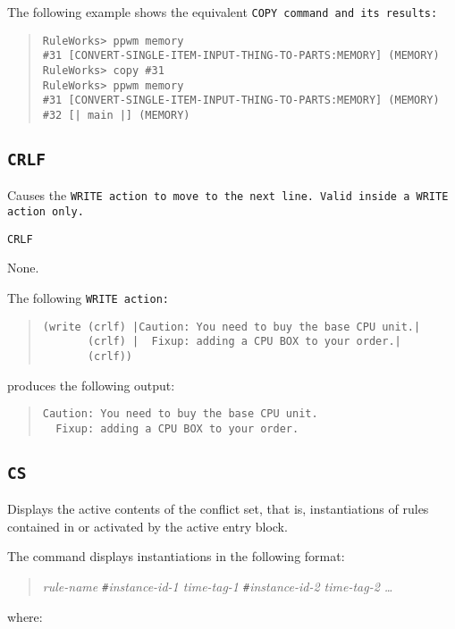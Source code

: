 The following example shows the equivalent \tt{COPY} command and its
results:

\begin{quote}
\begin{verbatim}
RuleWorks> ppwm memory
#31 [CONVERT-SINGLE-ITEM-INPUT-THING-TO-PARTS:MEMORY] (MEMORY)
RuleWorks> copy #31
RuleWorks> ppwm memory
#31 [CONVERT-SINGLE-ITEM-INPUT-THING-TO-PARTS:MEMORY] (MEMORY)
#32 [| main |] (MEMORY)
\end{verbatim}
\end{quote}

\subsection{\tt{CRLF}}

Causes the \tt{WRITE} action to move to the next line. Valid inside a
\tt{WRITE} action only.

\Format

\tt{CRLF}

\Arguments

None.

\Example

The following \tt{WRITE} action:

\begin{quote}
\begin{verbatim}
(write (crlf) |Caution: You need to buy the base CPU unit.|
       (crlf) |  Fixup: adding a CPU BOX to your order.|
       (crlf))
\end{verbatim}
\end{quote}

produces the following output:

\begin{quote}
\begin{verbatim}
Caution: You need to buy the base CPU unit.
  Fixup: adding a CPU BOX to your order.
\end{verbatim}
\end{quote}

\subsection{\tt{CS}}

Displays the active contents of the conflict set, that is,
instantiations of rules contained in or activated by the active entry
block.

The command displays instantiations in the following format:
\begin{quote}
  \it{rule-name} \verb|#|\it{instance-id-1} \it{time-tag-1}
  \verb|#|\it{instance-id-2} \it{time-tag-2} \ldots
\end{quote}
where:

